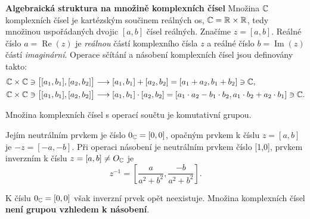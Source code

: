 \wikitextrule
\begin{example}\label{mai:exam048}
  \textbf{Algebraická struktura na množině komplexních čísel}\newline\small
    Množina \(\mathbb{C}\) komplexních čísel je kartézským součinem reálných os, \(\mathbb{C} = 
    \mathbb{R} \times \mathbb{R}\), tedy množinou uspořádaných dvojic \([a, b]\) čísel reálných. 
    Značíme \(z = [a, b]\). Reálné číslo \(a = \operatorname{Re}(z)\) je \emph{reálnou} částí 
    komplexního čísla \(z\) a reálné číslo \(b = \operatorname{Im}(z)\) částí \emph{imaginární}. 
    Operace sčítání a násobení komplexních čísel jsou definovány takto:
    \begin{align*}
      \mathbb{C}\times\mathbb{C}\ni\left[[a_1, b_1],[a_2, b_2]\right] &\longrightarrow
        [a_1, b_1] + [a_2, b_2] = [a_1 + a_2, b_1 + b_2]\ni\mathbb{C},                   \\
      \mathbb{C}\times\mathbb{C}\ni\left[[a_1, b_1],[a_2, b_2]\right] &\longrightarrow
        [a_1, b_1] \cdot [a_2, b_2] = 
        [a_1 \cdot a_2 - b_1 \cdot b_2, a_1 \cdot b_2 + a_2 \cdot b_1]\ni\mathbb{C}.
    \end{align*}
    
    Množina komplexních čísel s operací součtu je komutativní grupou. 
    
    Jejím neutrálním prvkem je číslo \(0_{\mathbb{C}} = [0,0]\), opačným prvkem k číslu \(z = [a, b]\) 
    je \(-z = [-a, - b]\). Při operaci násobení je neutrálním prvkem číslo [1,0], prvkem inverzním 
    k číslu \(z = [a, b] \neq O_{\mathbb{C}}\) je
    \begin{equation*}
      z^{-1} = \left[\dfrac{a}{a^2 + b^2}, \dfrac{-b}{a^2 + b^2}\right].
    \end{equation*}
    
    K číslu \(0_{\mathbb{C}} = [0,0]\) však inverzní prvek opět neexistuje. Množina komplexních čísel 
    \textbf{není grupou vzhledem k násobení}.
  \normalsize
\end{example}